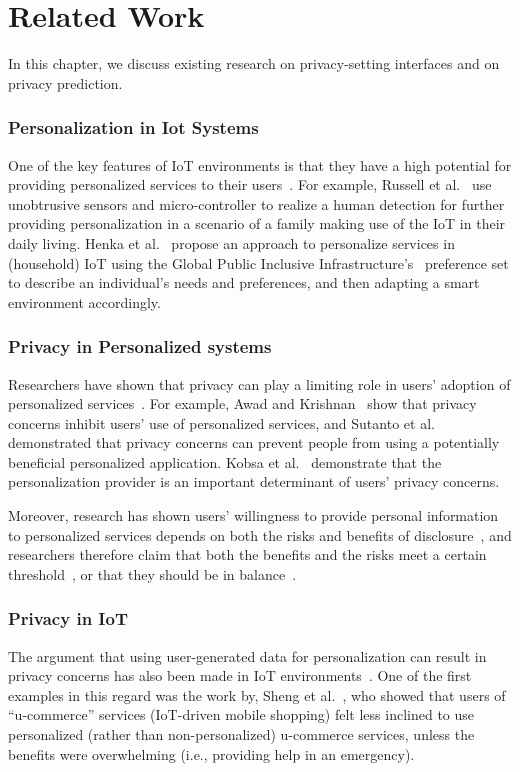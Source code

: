 \chapter{Related Work}
In this chapter, we discuss existing research on privacy-setting interfaces and on privacy prediction.

\subsection{Personalization in Iot Systems}
One of the key features of IoT environments is that they have a high potential for providing personalized services to their users~\cite{vallee2016personalization, etzion2014personalization, hemant2015internet}. For example, Russell et al.~\cite{russell2015personalization} use unobtrusive sensors and micro-controller to realize a human detection for further providing personalization in a scenario of a family making use of the IoT in their daily living. Henka et al.~\cite{henka2016personalizing} propose an approach to personalize services in (household) IoT using the Global Public Inclusive Infrastructure's~\cite{vanderheiden2011creating} preference set to describe an individual's needs and preferences, and then adapting a smart environment accordingly.

\subsection{Privacy in Personalized systems}
Researchers have shown that privacy can play a limiting role in users' adoption of personalized services~\cite{teltzrow_2004}.  For example, Awad and Krishnan~\cite{awad_2006} show that privacy concerns inhibit users' use of personalized services, and Sutanto et al.~\cite{sutanto_2013} demonstrated that privacy concerns can prevent people from using a potentially beneficial personalized application. Kobsa et al.~\cite{kobsa_2016} demonstrate that the personalization provider is an important determinant of users' privacy concerns.

Moreover, research has shown  users' willingness to provide personal information to personalized services depends on both the risks and benefits of disclosure~\cite{phelps_2000,ho_2006,hui_2006}, and researchers therefore claim that both the benefits and the risks meet a certain threshold~\cite{treiblmaier_2007}, or that they should be in balance~\cite{chellappa_2005}.

\subsection{Privacy in IoT}
The argument that using user-generated data for personalization can result in privacy concerns has also been made in IoT environments~\cite{worthy_trust_2016}. 
	One of the first examples in this regard was the work by, Sheng et al.~\cite{sheng_experimental_2008}, who showed that users of ``u-commerce'' services (IoT-driven mobile shopping) felt less inclined to use personalized (rather than non-personalized) u-commerce services, unless the benefits were overwhelming (i.e., providing help in an emergency).

